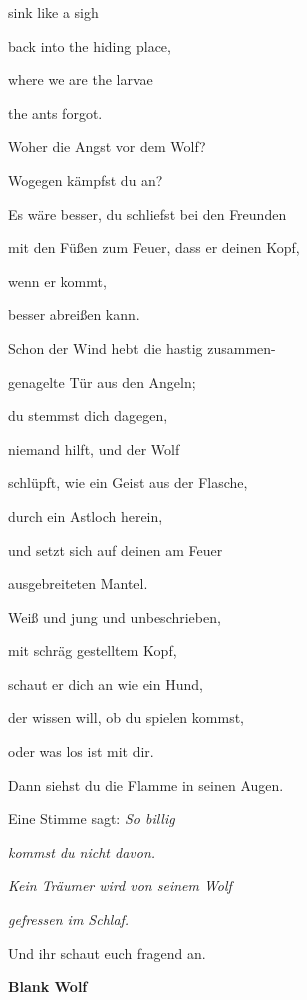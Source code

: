 \documentclass[a4paper]{article}
\begin{document}
sink like a sigh

back into the hiding place, 

where we are the larvae 

the ants forgot.



\bigskip

Woher die Angst vor dem Wolf?

Wogegen kämpfst du an?


\bigskip

Es wäre besser, du schliefst bei den Freunden

mit den Füßen zum Feuer, dass er deinen Kopf, 

wenn er kommt,

besser abreißen kann.


\bigskip

Schon der Wind hebt die hastig zusammen-

genagelte Tür aus den Angeln;

du stemmst dich dagegen, 

niemand hilft, und der Wolf 

schlüpft, wie ein Geist aus der Flasche,

durch ein Astloch herein,


\bigskip

und setzt sich auf deinen am Feuer

ausgebreiteten Mantel.

Weiß und jung und unbeschrieben,

mit schräg gestelltem Kopf, 

schaut er dich an wie ein Hund,

der wissen will, ob du spielen kommst, 

oder was los ist mit dir.


\bigskip

Dann siehst du die Flamme in seinen Augen. 

Eine Stimme sagt: \textit{So billig }

{\itshape
kommst du nicht davon.}

{\itshape
Kein Träumer wird von seinem Wolf }

{\itshape
gefressen im Schlaf.}


\bigskip

Und ihr schaut euch fragend an.


\bigskip

{\bfseries
Blank Wolf }
\end{document}
